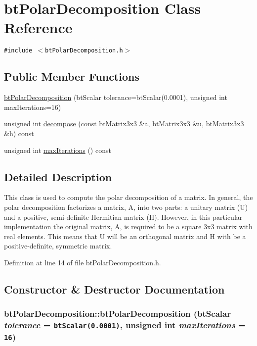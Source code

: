 \hypertarget{classbt_polar_decomposition}{
\section{btPolarDecomposition Class Reference}
\label{classbt_polar_decomposition}
}
{\tt \#include $<$btPolarDecomposition.h$>$}

\subsection*{Public Member Functions}
\begin{CompactItemize}
\item 
\hyperlink{classbt_polar_decomposition_10bfe3fb4d9163c9dce603bf77c0e1a0}{btPolarDecomposition} (btScalar tolerance=btScalar(0.0001), unsigned int maxIterations=16)
\item 
unsigned int \hyperlink{classbt_polar_decomposition_6ab0c88b30522ab42b6202a2f7a17eab}{decompose} (const btMatrix3x3 \&a, btMatrix3x3 \&u, btMatrix3x3 \&h) const 
\item 
unsigned int \hyperlink{classbt_polar_decomposition_c999bd3afdcc94a43ddbea028b5d4867}{maxIterations} () const 
\end{CompactItemize}


\subsection{Detailed Description}
This class is used to compute the polar decomposition of a matrix. In general, the polar decomposition factorizes a matrix, A, into two parts: a unitary matrix (U) and a positive, semi-definite Hermitian matrix (H). However, in this particular implementation the original matrix, A, is required to be a square 3x3 matrix with real elements. This means that U will be an orthogonal matrix and H with be a positive-definite, symmetric matrix. 

Definition at line 14 of file btPolarDecomposition.h.

\subsection{Constructor \& Destructor Documentation}
\hypertarget{classbt_polar_decomposition_10bfe3fb4d9163c9dce603bf77c0e1a0}{
\subsubsection[btPolarDecomposition]{\setlength{\rightskip}{0pt plus 5cm}btPolarDecomposition::btPolarDecomposition (btScalar {\em tolerance} = {\tt btScalar(0.0001)}, \/  unsigned int {\em maxIterations} = {\tt 16})}}
\label{classbt_polar_decomposition_10bfe3fb4d9163c9dce603bf77c0e1a0}


